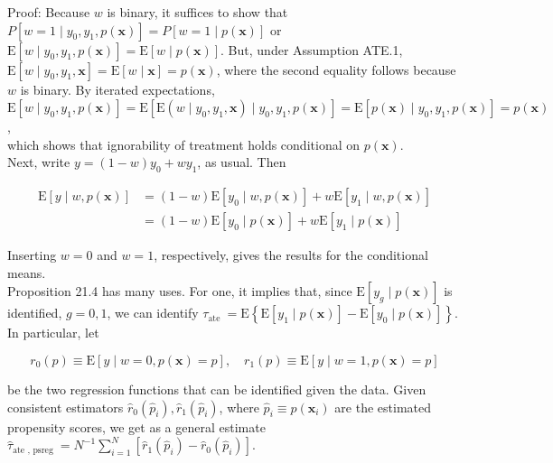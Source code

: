 \documentclass[10pt]{article}
\begin{document}
Proof: Because $w$ is binary, it suffices to show that $P\left[w=1 \mid y_{0}, y_{1}, p(\mathbf{x})\right]= P[w=1 \mid p(\mathbf{x})]$ or $\mathrm{E}\left[w \mid y_{0}, y_{1}, p(\mathbf{x})\right]=\mathrm{E}[w \mid p(\mathbf{x})]$. But, under Assumption ATE.1, $\mathrm{E}\left[w \mid y_{0}, y_{1}, \mathbf{x}\right]=\mathrm{E}[w \mid \mathbf{x}]=p(\mathbf{x})$, where the second equality follows because $w$ is binary. By iterated expectations,\\
$\mathrm{E}\left[w \mid y_{0}, y_{1}, p(\mathbf{x})\right]=\mathrm{E}\left[\mathrm{E}\left(w \mid y_{0}, y_{1}, \mathbf{x}\right) \mid y_{0}, y_{1}, p(\mathbf{x})\right]=\mathrm{E}\left[p(\mathbf{x}) \mid y_{0}, y_{1}, p(\mathbf{x})\right]=p(\mathbf{x})$,\\
which shows that ignorability of treatment holds conditional on $p(\mathbf{x})$.\\
Next, write $y=(1-w) y_{0}+w y_{1}$, as usual. Then

$$
\begin{aligned}
\mathrm{E}[y \mid w, p(\mathbf{x})] & =(1-w) \mathrm{E}\left[y_{0} \mid w, p(\mathbf{x})\right]+w \mathrm{E}\left[y_{1} \mid w, p(\mathbf{x})\right] \\
& =(1-w) \mathrm{E}\left[y_{0} \mid p(\mathbf{x})\right]+w \mathrm{E}\left[y_{1} \mid p(\mathbf{x})\right]
\end{aligned}
$$

Inserting $w=0$ and $w=1$, respectively, gives the results for the conditional means.\\
Proposition 21.4 has many uses. For one, it implies that, since $\mathrm{E}\left[y_{g} \mid p(\mathbf{x})\right]$ is identified, $g=0,1$, we can identify $\tau_{\text {ate }}=\mathrm{E}\left\{\mathrm{E}\left[y_{1} \mid p(\mathbf{x})\right]-\mathrm{E}\left[y_{0} \mid p(\mathbf{x})\right]\right\}$. In particular, let


\begin{equation*}
r_{0}(p) \equiv \mathrm{E}[y \mid w=0, p(\mathbf{x})=p], \quad r_{1}(p) \equiv \mathrm{E}[y \mid w=1, p(\mathbf{x})=p] \tag{21.50}
\end{equation*}


be the two regression functions that can be identified given the data. Given consistent estimators $\hat{r}_{0}\left(\hat{p}_{i}\right), \hat{r}_{1}\left(\hat{p}_{i}\right)$, where $\hat{p}_{i} \equiv \hat{p}\left(\mathbf{x}_{i}\right)$ are the estimated propensity scores, we get as a general estimate\\
$\hat{\tau}_{\text {ate }, \text { psreg }}=N^{-1} \sum_{i=1}^{N}\left[\hat{r}_{1}\left(\hat{p}_{i}\right)-\hat{r}_{0}\left(\hat{p}_{i}\right)\right]$.
\end{document}
